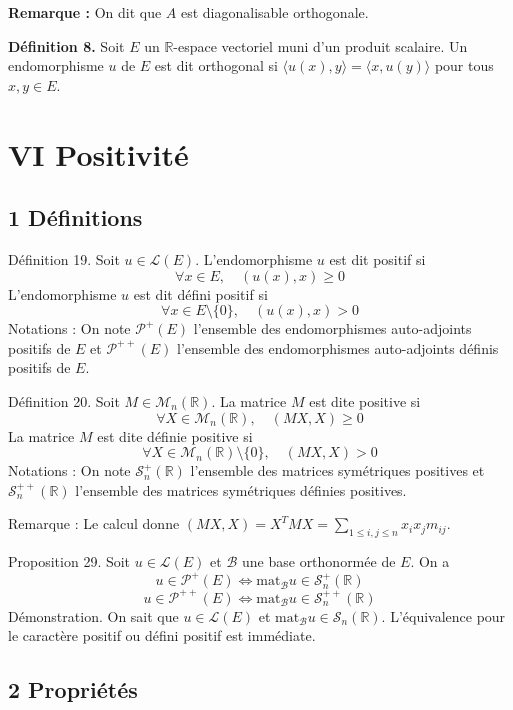 \textbf{Remarque :} On dit que $A$ est diagonalisable orthogonale.

\textbf{Définition 8.} Soit $E$ un $\mathbb{R}$-espace vectoriel muni d'un produit scalaire. Un endomorphisme $u$ de $E$ est dit orthogonal si $\langle u(x), y \rangle = \langle x, u(y) \rangle$ pour tous $x, y \in E$.


\section{VI Positivité}

\subsection{1 Définitions}

Définition 19. Soit $u \in \mathcal{L}(E)$. L'endomorphisme $u$ est dit positif si
\[
\forall x \in E, \quad (u(x),x) \geq 0
\]
L'endomorphisme $u$ est dit défini positif si
\[
\forall x \in E \setminus \{0\}, \quad (u(x),x) > 0
\]
Notations : On note $\mathcal{P}^{+}(E)$ l'ensemble des endomorphismes auto-adjoints positifs de $E$ et
$\mathcal{P}^{++}(E)$ l'ensemble des endomorphismes auto-adjoints définis positifs de $E$.

Définition 20. Soit $M \in \mathcal{M}_n(\mathbb{R})$. La matrice $M$ est dite positive si
\[
\forall X \in \mathcal{M}_n(\mathbb{R}), \quad (MX,X) \geq 0
\]
La matrice $M$ est dite définie positive si
\[
\forall X \in \mathcal{M}_n(\mathbb{R}) \setminus \{0\}, \quad (MX,X) > 0
\]
Notations : On note $\mathcal{S}_n^{+}(\mathbb{R})$ l'ensemble des matrices symétriques positives et $\mathcal{S}_n^{++}(\mathbb{R})$ l'ensemble des matrices symétriques définies positives.

Remarque : Le calcul donne $(MX,X) = X^T MX = \sum_{1 \leq i,j \leq n} x_i x_j m_{ij}$.

Proposition 29. Soit $u \in \mathcal{L}(E)$ et $\mathcal{B}$ une base orthonormée de $E$. On a
\[
u \in \mathcal{P}^{+}(E) \Leftrightarrow \text{mat}_{\mathcal{B}} u \in \mathcal{S}_n^{+}(\mathbb{R})
\]
\[
u \in \mathcal{P}^{++}(E) \Leftrightarrow \text{mat}_{\mathcal{B}} u \in \mathcal{S}_n^{++}(\mathbb{R})
\]
Démonstration. On sait que $u \in \mathcal{L}(E)$ et $\text{mat}_{\mathcal{B}} u \in \mathcal{S}_n(\mathbb{R})$. L'équivalence pour le caractère positif ou défini positif est immédiate.

\subsection{2 Propriétés}

